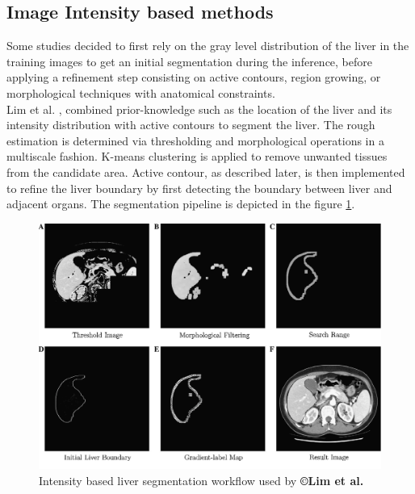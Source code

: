 \subsection{Image Intensity based methods}

Some studies decided to first rely on the gray level distribution of
the liver in the training images to get an initial segmentation during
the inference, before applying a refinement step consisting on active
contours, region growing, or morphological techniques with anatomical
constraints.\\
Lim et al. \cite{Lim2004, Lim2005, Lim2006}, combined prior-knowledge such as the location of the liver
and its intensity distribution with active contours to segment the
liver. The rough estimation is determined via thresholding and
morphological operations in a multiscale fashion. K-means clustering is
applied to remove unwanted tissues from the candidate area. Active
contour, as described later, is then implemented to refine the liver boundary by first
detecting the boundary between liver and adjacent organs.
The segmentation pipeline is depicted in the figure \ref{IntensityBasedLim}.

\begin{figure}[ht!]
	\centering
	\includegraphics[width=0.7\linewidth]{images/Lim2006_Fig14}
	\caption{Intensity based liver segmentation workflow used by \textbf{©Lim et al.  \cite{Lim2006}}}
	\label{IntensityBasedLim}
\end{figure}

